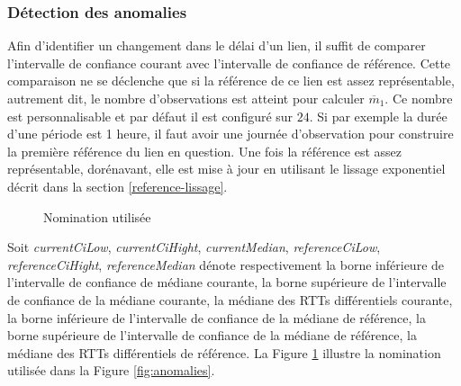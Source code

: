\subsubsection{Détection des anomalies}
Afin d'identifier un changement dans le délai d'un lien, il suffit de comparer l'intervalle de confiance courant avec l'intervalle de 
confiance de référence. Cette comparaison ne se déclenche que si la référence de ce lien est assez représentable, autrement dit, le nombre d'observations est atteint pour calculer $\overline{m}_{1}$. Ce nombre est personnalisable et par défaut il est configuré sur $ 24 $. Si par exemple la durée d'une période est 1 heure, il faut avoir une journée d'observation pour construire la première référence du lien en question. Une fois la référence est  assez représentable, dorénavant,  elle est mise à jour en utilisant  le lissage exponentiel décrit dans la section \ref{reference-lissage}.
\begin{figure}
	\captionsetup{justification=centering}
	
	\resizebox{.4\textwidth}{!}{
		
	}
	\caption{Nomination utilisée}
	\label{fig:explainCis}
\end{figure}

 
  Soit \textit{currentCiLow}, \textit{currentCiHight}, \textit{currentMedian}, \textit{referenceCiLow}, \textit{referenceCiHight}, \textit{referenceMedian} dénote respectivement la borne inférieure de l'intervalle de confiance de médiane courante, la borne supérieure de l'intervalle de confiance de la médiane courante, la médiane des RTTs différentiels courante, la borne inférieure de l'intervalle de confiance de la médiane de référence, la borne supérieure de l'intervalle de confiance de la médiane de référence, la médiane des RTTs différentiels de référence. La Figure 	\ref{fig:explainCis} illustre la nomination utilisée dans la Figure \ref{fig:anomalies}.
 
